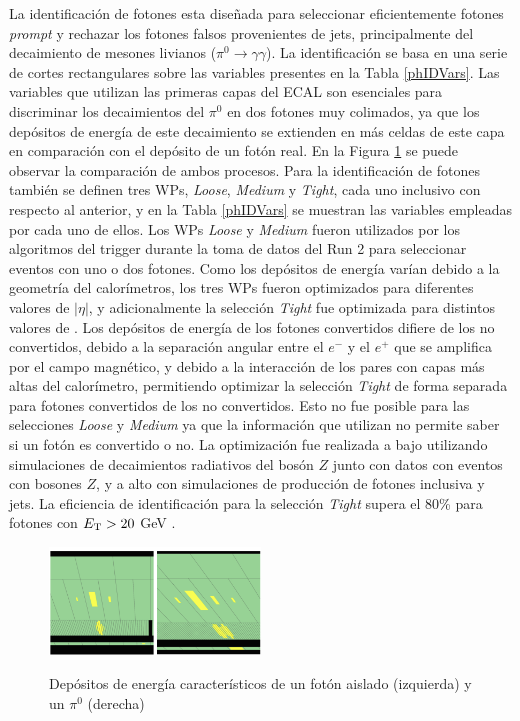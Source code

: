 La identificación de fotones esta diseñada para seleccionar eficientemente fotones \textit{prompt} y rechazar los fotones falsos provenientes de jets, principalmente del decaimiento de mesones livianos ($\pi^{0}\to\gamma\gamma$). La identificación se basa en una serie de cortes rectangulares sobre las variables presentes en la Tabla \ref{phIDVars}. Las variables que utilizan las primeras capas del ECAL son esenciales para discriminar los decaimientos del $\pi^{0}$ en dos fotones muy colimados, ya que los depósitos de energía de este decaimiento se extienden en más celdas de este capa en comparación con el depósito de un fotón real. En la Figura \ref{phpizero} se puede observar la comparación de ambos procesos. 
Para la identificación de fotones también se definen tres WPs, \textit{Loose}, \textit{Medium} y \textit{Tight}, cada uno inclusivo con respecto al anterior, y en la Tabla \ref{phIDVars} se muestran las variables empleadas por cada uno de ellos. Los WPs \textit{Loose} y \textit{Medium} fueron utilizados por los algoritmos del trigger durante la toma de datos del Run 2 para seleccionar eventos con uno o dos fotones. Como los depósitos de energía varían debido a la geometría del calorímetros, los tres WPs fueron optimizados para diferentes valores de $|\eta|$, y adicionalmente la selección \textit{Tight} fue optimizada para distintos valores de \ET. Los depósitos de energía de los fotones convertidos difiere de los no convertidos, debido a la separación angular entre el $e^-$ y el $e^+$ que se amplifica por el campo magnético, y debido a la interacción de los pares con capas más altas del calorímetro, permitiendo optimizar la selección \textit{Tight} de forma separada para fotones convertidos de los no convertidos. Esto no fue posible para las selecciones \textit{Loose} y \textit{Medium} ya que la información que utilizan no permite saber si un fotón es convertido o no. La optimización fue realizada a bajo \ET utilizando simulaciones de decaimientos radiativos del bosón $Z$ junto con datos con eventos con bosones $Z$, y a alto \ET con simulaciones de producción de fotones inclusiva y jets. La eficiencia de identificación para la selección \textit{Tight} supera el 80\% para fotones con $E_{\text{T}}>20$ GeV \cite{EGAM-2018-01}.

\begin{figure}
\centering
\caption{Depósitos de energía característicos de un fotón aislado (izquierda) y un $\pi^0$ (derecha) }
  \includegraphics[width=0.5\textwidth]{images/PhotonPizero.png}
  \label{phpizero}
\end{figure}


